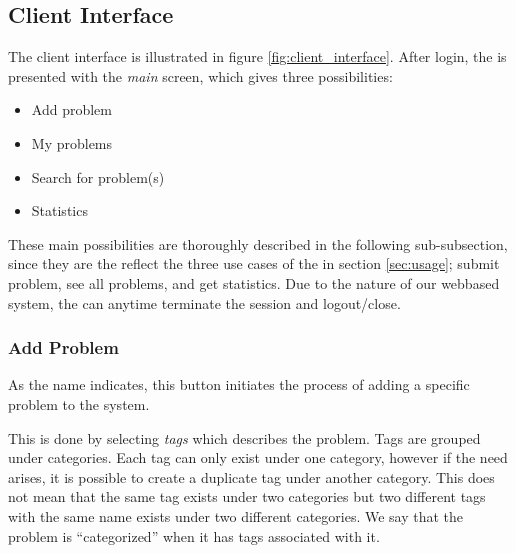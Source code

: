 \subsection{Client Interface}
\label{sec:client_interface}

The client interface is illustrated in figure \ref{fig:client_interface}.
After login, the \aclient[] is presented with the \textit{main} screen, which gives three possibilities:
\begin{itemize}
	\item Add problem
	\item My problems
	\item Search for problem(s)
	\item Statistics
\end{itemize}

These main possibilities are thoroughly described in the following sub-subsection, since they are the reflect the three use cases of the \aclient[] in section \ref{sec:usage}; submit problem, see all problems, and get statistics.
Due to the nature of our webbased system, the \aclient[] can anytime terminate the session and logout/close.

\subsubsection{Add Problem}
As the name indicates, this button initiates the process of adding a specific problem to the system.

This is done by selecting \textit{tags} which describes the problem. Tags are grouped under categories. Each tag can only exist under one category, however if the need arises, it is possible to create a duplicate tag under another category. This does not mean that the same tag exists under two categories but two different tags with the same name exists under two different categories.
We say that the problem is ``categorized'' when it has tags associated with it.

